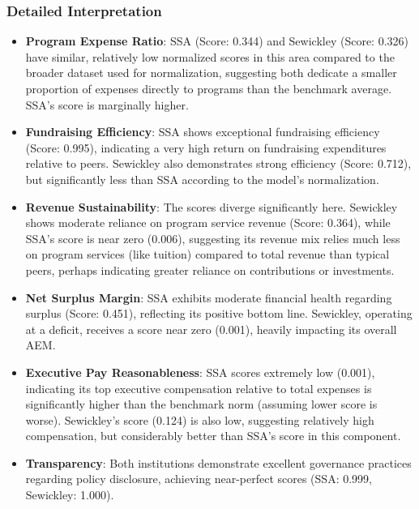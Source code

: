 \documentclass[12pt]{article}
\begin{document}
\subsubsection{Detailed Interpretation} %
\begin{itemize}
    \item \textbf{Program Expense Ratio}: SSA (Score: 0.344) and Sewickley (Score: 0.326) have similar, relatively low normalized scores in this area compared to the broader dataset used for normalization, suggesting both dedicate a smaller proportion of expenses directly to programs than the benchmark average. SSA's score is marginally higher.
    \item \textbf{Fundraising Efficiency}: SSA shows exceptional fundraising efficiency (Score: 0.995), indicating a very high return on fundraising expenditures relative to peers. Sewickley also demonstrates strong efficiency (Score: 0.712), but significantly less than SSA according to the model's normalization.
    \item \textbf{Revenue Sustainability}: The scores diverge significantly here. Sewickley shows moderate reliance on program service revenue (Score: 0.364), while SSA's score is near zero (0.006), suggesting its revenue mix relies much less on program services (like tuition) compared to total revenue than typical peers, perhaps indicating greater reliance on contributions or investments.
    \item \textbf{Net Surplus Margin}: SSA exhibits moderate financial health regarding surplus (Score: 0.451), reflecting its positive bottom line. Sewickley, operating at a deficit, receives a score near zero (0.001), heavily impacting its overall AEM.
    \item \textbf{Executive Pay Reasonableness}: SSA scores extremely low (0.001), indicating its top executive compensation relative to total expenses is significantly higher than the benchmark norm (assuming lower score is worse). Sewickley's score (0.124) is also low, suggesting relatively high compensation, but considerably better than SSA's score in this component.
    \item \textbf{Transparency}: Both institutions demonstrate excellent governance practices regarding policy disclosure, achieving near-perfect scores (SSA: 0.999, Sewickley: 1.000).
\end{itemize}
\end{document}
